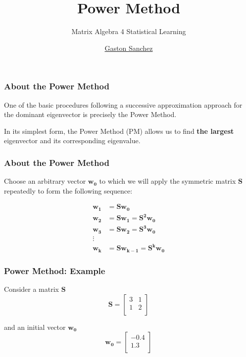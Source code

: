 \documentclass[12pt]{beamer}\usepackage[]{graphicx}\usepackage[]{color}
\title{Power Method}
\subtitle{Matrix Algebra 4 Statistical Learning}
\author{\href{http://www.gastonsanchez.com}{Gaston Sanchez}}
\institute{\href{https://creativecommons.org/licenses/by-sa/4.0/}{\tt \scriptsize \color{foreground} CC BY-SA 4.0}}
\date{}
\begin{document}
{
  \frame{\titlepage} 
}


\begin{frame}
\begin{center}
\Huge{}
\end{center}
\end{frame}


\begin{frame}
\frametitle{About the Power Method}

One of the basic procedures following a successive approximation 
approach for the dominant eigenvector is precisely the {\hilit Power Method}.

\bigskip
In its simplest form, the Power Method (PM) allows us to find \textbf{the largest} 
eigenvector and its corresponding eigenvalue.

\end{frame}


\begin{frame}
\frametitle{About the Power Method}

Choose an arbitrary vector $\mathbf{w_0}$ to which we will apply the symmetric matrix 
$\mathbf{S}$ repeatedly to form the following sequence:

\begin{align*}
 \mathbf{w_1} &= \mathbf{S w_0} \\
 \mathbf{w_2} &= \mathbf{S w_1 = S^2 w_0} \\
 \mathbf{w_3} &= \mathbf{S w_2 = S^3 w_0} \\
 \vdots \\
 \mathbf{w_k} &= \mathbf{S w_{k-1} = S^k w_0}
\end{align*}

\end{frame}


\begin{frame}[fragile]
\frametitle{Power Method: Example}

Consider a matrix $\mathbf{S}$
$$
\mathbf{S} =
\begin{bmatrix}
3 & 1 \\
1 & 2 \\
\end{bmatrix}
$$

\bigskip
and an initial vector $\mathbf{w_0}$
$$
\mathbf{w_0} =
\begin{bmatrix}
-0.4 \\
1.3 \\
\end{bmatrix}
$$

\end{frame}
\end{document}
